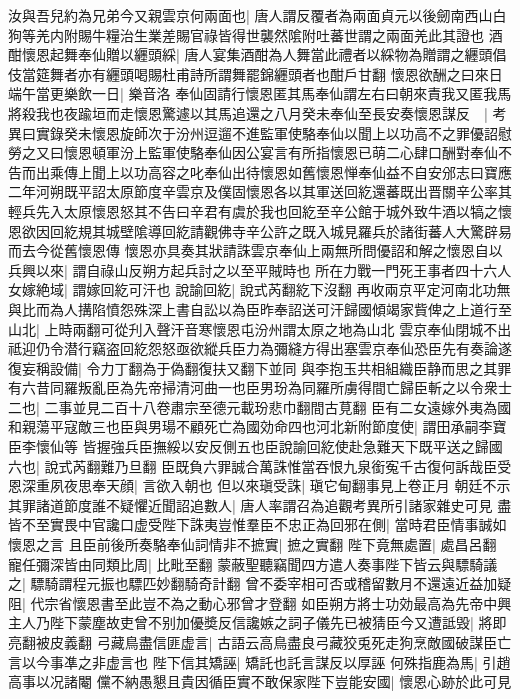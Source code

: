 汝與吾兒約為兄弟今又親雲京何兩面也|{
	唐人謂反覆者為兩面貞元以後劒南西山白狗等羌内附賜牛糧治生業差賜官祿皆得世襲然隂附吐蕃世謂之兩面羌此其證也}
酒酣懷恩起舞奉仙贈以纒頭綵|{
	唐人宴集酒酣為人舞當此禮者以綵物為贈謂之纒頭倡伎當筵舞者亦有纒頭喝賜杜甫詩所謂舞罷錦纒頭者也酣戶甘翻}
懷恩欲酬之曰來日端午當更樂飲一日|{
	樂音洛}
奉仙固請行懷恩匿其馬奉仙謂左右曰朝來責我又匿我馬將殺我也夜踰垣而走懷恩驚遽以其馬追還之八月癸未奉仙至長安奏懷恩謀反　|{
	考異曰實錄癸未懷恩旋師次于汾州逗遛不進監軍使駱奉仙以聞上以功高不之罪優詔慰勞之又曰懷恩頓軍汾上監軍使駱奉仙因公宴言有所指懷恩已萌二心肆口酬對奉仙不告而出乘傳上聞上以功高容之叱奉仙出待懷恩如舊懷恩惮奉仙益不自安邠志曰寶應二年河朔既平詔太原節度辛雲京及僕固懷恩各以其軍送回紇還蕃既出晋關辛公率其輕兵先入太原懷恩怒其不告曰辛君有虞於我也回紇至辛公館于城外致牛酒以犒之懷恩欲因回紇規其城壁隂導回紇請觀佛寺辛公許之既入城見羅兵於諸街蕃人大驚辟易而去今從舊懷恩傳}
懷恩亦具奏其狀請誅雲京奉仙上兩無所問優詔和解之懷恩自以兵興以來|{
	謂自祿山反朔方起兵討之以至平賊時也}
所在力戰一門死王事者四十六人女嫁絶域|{
	謂嫁回紇可汗也}
說諭回紇|{
	說式芮翻紇下沒翻}
再收兩京平定河南北功無與比而為人搆陷憤怨殊深上書自訟以為臣昨奉詔送可汗歸國傾竭家貲俾之上道行至山北|{
	上時兩翻可從刋入聲汗音寒懷恩屯汾州謂太原之地為山北}
雲京奉仙閉城不出祗迎仍令潜行竊盗回紇怨怒亟欲縱兵臣力為彌縫方得出塞雲京奉仙恐臣先有奏論遂復妄稱設備|{
	令力丁翻為于偽翻復扶又翻下並同}
與李抱玉共相組織臣静而思之其罪有六昔同羅叛亂臣為先帝掃清河曲一也臣男玢為同羅所虜得間亡歸臣斬之以令衆士二也|{
	二事並見二百十八卷肅宗至德元載玢悲巾翻間古莧翻}
臣有二女遠嫁外夷為國和親蕩平寇敵三也臣與男瑒不顧死亡為國効命四也河北新附節度使|{
	謂田承嗣李寶臣李懷仙等}
皆握強兵臣撫綏以安反側五也臣說諭回紇使赴急難天下既平送之歸國六也|{
	說式芮翻難乃旦翻}
臣既負六罪誠合萬誅惟當吞恨九泉銜寃千古復何訴哉臣受恩深重夙夜思奉天顔|{
	言欲入朝也}
但以來瑱受誅|{
	瑱它甸翻事見上卷正月}
朝廷不示其罪諸道節度誰不疑懼近聞詔追數人|{
	唐人率謂召為追觀考異所引諸家雜史可見}
盡皆不至實畏中官讒口虚受陛下誅夷豈惟羣臣不忠正為回邪在側|{
	當時君臣情事誠如懷恩之言}
且臣前後所奏駱奉仙詞情非不摭實|{
	摭之實翻}
陛下竟無處置|{
	處昌呂翻}
寵任彌深皆由同類比周|{
	比毗至翻}
蒙蔽聖聽竊聞四方遣人奏事陛下皆云與驃騎議之|{
	驃騎謂程元振也驃匹妙翻騎奇計翻}
曾不委宰相可否或稽留數月不還遠近益加疑阻|{
	代宗省懷恩書至此豈不為之動心邪曾才登翻}
如臣朔方將士功効最高為先帝中興主人乃陛下蒙塵故吏曾不别加優奬反信讒嫉之詞子儀先已被猜臣今又遭詆毁|{
	將即亮翻被皮義翻}
弓藏鳥盡信匪虚言|{
	古語云高鳥盡良弓藏狡兎死走狗烹敵國破謀臣亡言以今事凖之非虚言也}
陛下信其矯誣|{
	矯託也託言謀反以厚誣}
何殊指鹿為馬|{
	引趙高事以况諸閹}
儻不納愚懇且貴因循臣實不敢保家陛下豈能安國|{
	懷恩心跡於此可見}
